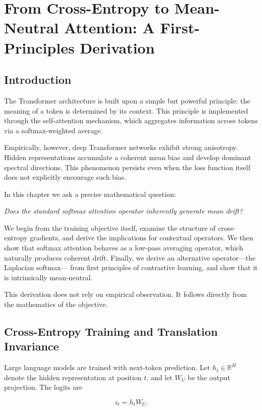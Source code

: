 \chapter{From Cross-Entropy to Mean-Neutral Attention: A First-Principles Derivation}
\label{chap:laplacian_softmax}

\section{Introduction}

The Transformer architecture is built upon a simple but powerful principle:
the meaning of a token is determined by its context.
This principle is implemented through the self-attention mechanism,
which aggregates information across tokens via a softmax-weighted average.

Empirically, however, deep Transformer networks exhibit strong anisotropy.
Hidden representations accumulate a coherent mean bias and develop
dominant spectral directions.
This phenomenon persists even when the loss function itself
does not explicitly encourage such bias.

In this chapter we ask a precise mathematical question:

\emph{Does the standard softmax attention operator inherently generate mean drift?}

We begin from the training objective itself, examine the structure of
cross-entropy gradients, and derive the implications for contextual operators.
We then show that softmax attention behaves as a low-pass averaging operator,
which naturally produces coherent drift.
Finally, we derive an alternative operator---the Laplacian softmax---
from first principles of contrastive learning,
and show that it is intrinsically mean-neutral.

This derivation does not rely on empirical observation.
It follows directly from the mathematics of the objective.

\section{Cross-Entropy Training and Translation Invariance}

Large language models are trained with next-token prediction.
Let $h_t \in \mathbb{R}^H$ denote the hidden representation at position $t$,
and let $W_U$ be the output projection.
The logits are

\begin{equation}
z_t = h_t W_U.
\end{equation}

